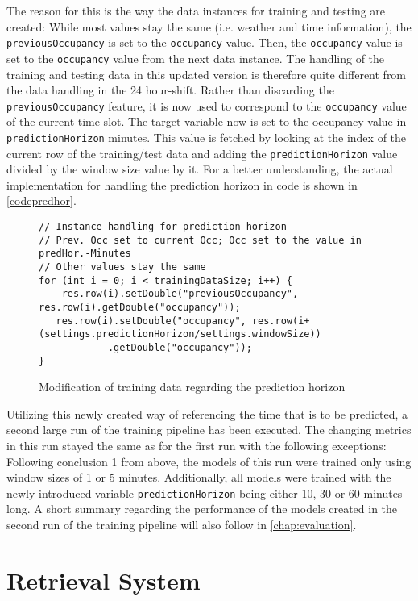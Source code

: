 The reason for this is the way the data instances for training and testing are created: While most values stay the same (i.e. weather and time information), the \texttt{previousOccupancy} is set to the \texttt{occupancy} value. Then, the \texttt{occupancy} value is set to the \texttt{occupancy} value from the next data instance. The handling of the training and testing data in this updated version is therefore quite different from the data handling in the 24 hour-shift. Rather than discarding the \texttt{previousOccupancy} feature, it is now used to correspond to the \texttt{occupancy} value of the current time slot. The target variable now is set to the occupancy value in \texttt{predictionHorizon} minutes. This value is fetched by looking at the index of the current row of the training/test data and adding the \texttt{predictionHorizon} value divided by the window size value by it. For a better understanding, the actual implementation for handling the prediction horizon in code is shown in \autoref{codepredhor}.


\begin{figure}
\begin{lstlisting}
// Instance handling for prediction horizon
// Prev. Occ set to current Occ; Occ set to the value in predHor.-Minutes 
// Other values stay the same
for (int i = 0; i < trainingDataSize; i++) {
	res.row(i).setDouble("previousOccupancy", res.row(i).getDouble("occupancy"));
   res.row(i).setDouble("occupancy", res.row(i+(settings.predictionHorizon/settings.windowSize))
            .getDouble("occupancy"));
}
\end{lstlisting}
\caption{Modification of training data regarding the prediction horizon}
\label{codepredhor}
\end{figure}


Utilizing this newly created way of referencing the time that is to be predicted, a second large run of the training pipeline has been executed. The changing metrics in this run stayed the same as for the first run with the following exceptions: Following conclusion 1 from above, the models of this run were trained only using window sizes of 1 or 5 minutes. Additionally, all models were trained with the newly introduced variable \texttt{predictionHorizon} being either 10, 30 or 60 minutes long. A short summary regarding the performance of the models created in the second run of the training pipeline will also follow in \autoref{chap:evaluation}.



\section{Retrieval System}
 

